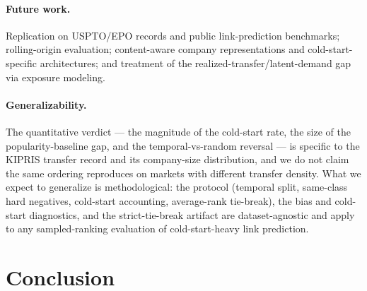\documentclass[preprint,12pt]{elsarticle}
\begin{document}
\paragraph{Future work.} Replication on USPTO/EPO records and public link-prediction
benchmarks; rolling-origin evaluation; content-aware company representations and
cold-start-specific architectures; and treatment of the realized-transfer/latent-demand
gap via exposure modeling.

\paragraph{Generalizability.} The quantitative verdict --- the magnitude of the
cold-start rate, the size of the popularity-baseline gap, and the temporal-vs-random
reversal --- is specific to the KIPRIS transfer record and its company-size
distribution, and we do not claim the same ordering reproduces on markets with
different transfer density. What we expect to generalize is methodological: the
protocol (temporal split, same-class hard negatives, cold-start accounting,
average-rank tie-break), the bias and cold-start diagnostics, and the
strict-tie-break artifact are dataset-agnostic and apply to any sampled-ranking
evaluation of cold-start-heavy link prediction.

\section{Conclusion}
\label{sec:conclusion}
\end{document}
